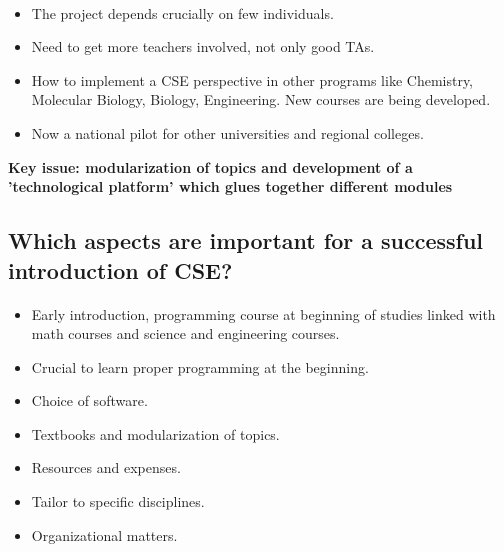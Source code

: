 \documentclass[%
twoside,                 %
final,                   %
10pt]{article}
\begin{document}
\paragraph{}

\begin{itemize}
\item The project depends crucially on few individuals. 

\item Need to get more teachers involved, not only good TAs.

\item How  to implement a CSE perspective in other programs like Chemistry, Molecular Biology,  Biology, Engineering. New courses are being developed.

\item Now a national pilot for other universities and regional colleges.
\end{itemize}

\noindent
\textbf{Key issue: modularization of topics and development of a 'technological platform' which glues together different modules}



\subsection*{Which aspects are important for a successful introduction of CSE?}

\paragraph{}

\begin{itemize}
\item Early introduction, programming course at beginning of studies linked with math courses and science and engineering courses.

\item Crucial to learn proper programming at the beginning.

\item Choice of software.

\item Textbooks and modularization of topics.

\item Resources and expenses.

\item Tailor to specific disciplines.

\item Organizational matters.
\end{itemize}
\end{document}
